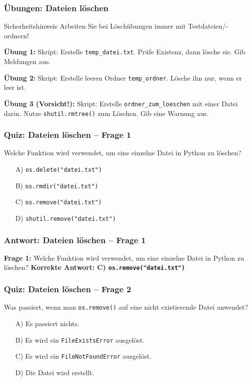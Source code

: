 \documentclass[aspectratio=169]{beamer} %
\begin{document}
\begin{frame}[fragile]
\frametitle{Übungen: Dateien löschen}
\begin{alertblock}{Sicherheitshinweis}
Arbeiten Sie bei Löschübungen immer mit Testdateien/-ordnern!
\end{alertblock}

\textbf{Übung 1:}
Skript: Erstelle \texttt{temp\_datei.txt}. Prüfe Existenz, dann lösche sie. Gib Meldungen aus.
\vspace{0.5em}

\textbf{Übung 2:}
Skript: Erstelle leeren Ordner \texttt{temp\_ordner}. Lösche ihn nur, wenn er leer ist.
\vspace{0.5em}

\textbf{Übung 3 (Vorsicht!):}
Skript: Erstelle \texttt{ordner\_zum\_loeschen} mit einer Datei darin. Nutze \texttt{shutil.rmtree()} zum Löschen. Gib eine Warnung aus.
\end{frame}

\begin{frame}[fragile]
\frametitle{Quiz: Dateien löschen – Frage 1}
Welche Funktion wird verwendet, um eine einzelne Datei in Python zu löschen?
\begin{enumerate}
    \item[A)] \texttt{os.delete("datei.txt")}
    \item[B)] \texttt{os.rmdir("datei.txt")}
    \item[C)] \texttt{os.remove("datei.txt")}
    \item[D)] \texttt{shutil.remove("datei.txt")}
\end{enumerate}
\end{frame}

\begin{frame}[fragile]
\frametitle{Antwort: Dateien löschen – Frage 1}
\textbf{Frage 1:} Welche Funktion wird verwendet, um eine einzelne Datei in Python zu löschen?
\vspace{1em}
\textbf{Korrekte Antwort: C) \texttt{os.remove("datei.txt")}}
\end{frame}

\begin{frame}[fragile]
\frametitle{Quiz: Dateien löschen – Frage 2}
Was passiert, wenn man \texttt{os.remove()} auf eine nicht existierende Datei anwendet?
\begin{enumerate}
    \item[A)] Es passiert nichts.
    \item[B)] Es wird ein \texttt{FileExistsError} ausgelöst.
    \item[C)] Es wird ein \texttt{FileNotFoundError} ausgelöst.
    \item[D)] Die Datei wird erstellt.
\end{enumerate}
\end{frame}
\end{document}

